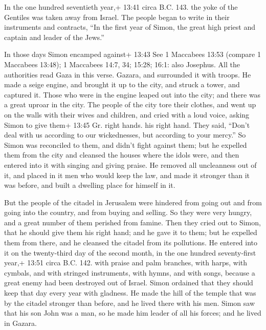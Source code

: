  In the one hundred seventieth year,+ 13:41 circa B.C. 143.
the yoke of the Gentiles was taken away from Israel.  The
people began to write in their instruments and contracts, ``In the first
year of Simon, the great high priest and captain and leader of the
Jews.''

 In those days Simon encamped against+ 13:43 See 1
Maccabees 13:53 (compare 1 Maccabees 13:48); 1 Maccabees 14:7, 34;
15:28; 16:1: also Josephus. All the authorities read Gaza in this verse.
Gazara, and surrounded it with troops. He made a seige engine, and
brought it up to the city, and struck a tower, and captured it.
 Those who were in the engine leaped out into the city; and
there was a great uproar in the city.  The people of the
city tore their clothes, and went up on the walls with their wives and
children, and cried with a loud voice, asking Simon to give them+ 13:45
Gr. right hands. his right hand.  They said, ``Don't deal
with us according to our wickednesses, but according to your mercy.''
 So Simon was reconciled to them, and didn't fight against
them; but he expelled them from the city and cleansed the houses where
the idols were, and then entered into it with singing and giving praise.
 He removed all uncleanness out of it, and placed in it men
who would keep the law, and made it stronger than it was before, and
built a dwelling place for himself in it.

 But the people of the citadel in Jerusalem were hindered
from going out and from going into the country, and from buying and
selling. So they were very hungry, and a great number of them perished
from famine.  Then they cried out to Simon, that he should
give them his right hand; and he gave it to them; but he expelled them
from there, and he cleansed the citadel from its pollutions.
 He entered into it on the twenty-third day of the second
month, in the one hundred seventy-first year,+ 13:51 circa B.C. 142.
with praise and palm branches, with harps, with cymbals, and with
stringed instruments, with hymns, and with songs, because a great enemy
had been destroyed out of Israel.  Simon ordained that they
should keep that day every year with gladness. He made the hill of the
temple that was by the citadel stronger than before, and he lived there
with his men.  Simon saw that his son John was a man, so he
made him leader of all his forces; and he lived in Gazara.

